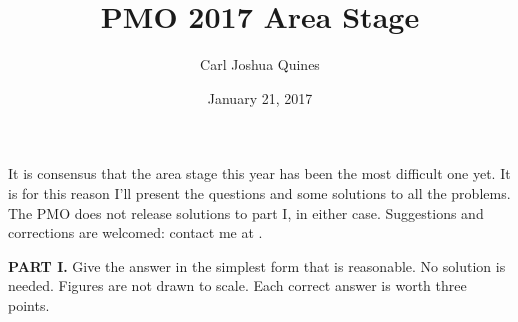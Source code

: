 \documentclass[11pt,paper=letter]{scrartcl}
\begin{document}
\title{PMO 2017 Area Stage}
\author{Carl Joshua Quines}
\date{January 21, 2017}

\maketitle

It is consensus that the area stage this year has been the most difficult one yet. It is for this reason I'll present the questions and some solutions to all the problems. The PMO does not release solutions to part I, in either case. Suggestions and corrections are welcomed: contact me at .

\textbf{PART I.} Give the answer in the simplest form that is reasonable. No solution is needed. Figures are not drawn to scale. Each correct answer is worth three points.
\end{document}
